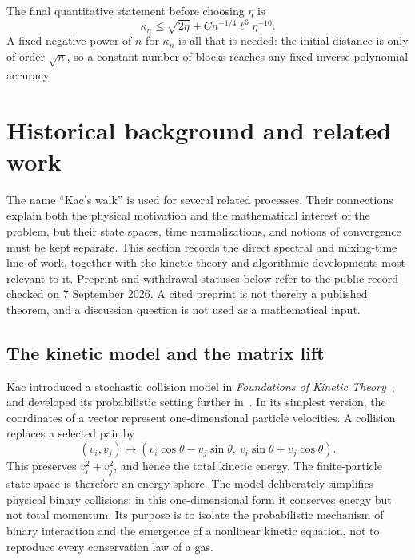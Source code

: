 \documentclass[11pt]{article}
\theoremstyle{definition}\newtheorem{definition}[theorem]{Definition}
\theoremstyle{remark}\newtheorem{remark}[theorem]{Remark}
\begin{document}
The final quantitative statement before choosing $\eta$ is
\begin{equation}\label{eq:intro-uniform-block}
 \kappa_n\le\sqrt{2\eta}+Cn^{-1/4}\ell^6\eta^{-10}.
\end{equation}
A fixed negative power of $n$ for $\kappa_n$ is all that is needed: the initial distance is only of order $\sqrt n$, so a constant number of blocks reaches any fixed inverse-polynomial accuracy.


\section{Historical background and related work}\label{sec:history}
The name ``Kac's walk'' is used for several related processes. Their connections explain both the physical motivation and the mathematical interest of the problem, but their state spaces, time normalizations, and notions of convergence must be kept separate. This section records the direct spectral and mixing-time line of work, together with the kinetic-theory and algorithmic developments most relevant to it. Preprint and withdrawal statuses below refer to the public record checked on 7 September 2026. A cited preprint is not thereby a published theorem, and a discussion question is not used as a mathematical input.

\subsection{The kinetic model and the matrix lift}
Kac introduced a stochastic collision model in \emph{Foundations of Kinetic Theory}~\cite{Kac56}, and developed its probabilistic setting further in~\cite{Kac59}. In its simplest version, the coordinates of a vector represent one-dimensional particle velocities. A collision replaces a selected pair by
\[
 (v_i,v_j)\longmapsto
 (v_i\cos\theta-v_j\sin\theta,\ v_i\sin\theta+v_j\cos\theta).
\]
This preserves $v_i^2+v_j^2$, and hence the total kinetic energy. The finite-particle state space is therefore an energy sphere. The model deliberately simplifies physical binary collisions: in this one-dimensional form it conserves energy but not total momentum. Its purpose is to isolate the probabilistic mechanism of binary interaction and the emergence of a nonlinear kinetic equation, not to reproduce every conservation law of a gas.
\end{document}
